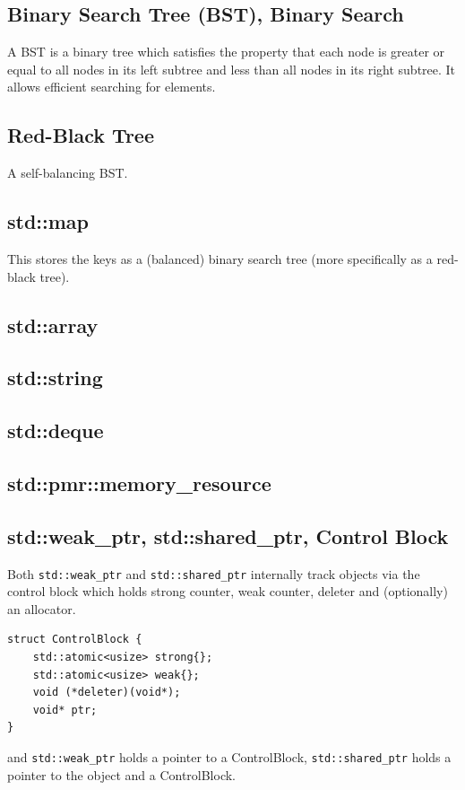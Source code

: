 \documentclass{article}
\begin{document}
\subsection{Binary Search Tree (BST), Binary Search}
A BST is a binary tree which satisfies the property that each node is greater or equal to all nodes in its left subtree and less than all nodes in its right subtree. It allows efficient searching for elements. 

\subsection{Red-Black Tree}
A self-balancing BST.

\subsection{std::map}
This stores the keys as a (balanced) binary search tree (more specifically as a red-black tree).

\subsection{std::array}
\subsection{std::string}
\subsection{std::deque}
\subsection{std::pmr::memory\_resource}
\subsection{std::weak\_ptr, std::shared\_ptr, Control Block}
Both \texttt{std::weak\_ptr} and \texttt{std::shared\_ptr} internally track objects via the control block which holds strong counter, weak counter, deleter and (optionally) an allocator.
\begin{lstlisting}
struct ControlBlock {
    std::atomic<usize> strong{};
    std::atomic<usize> weak{};
    void (*deleter)(void*);
    void* ptr;
}
\end{lstlisting}
and \texttt{std::weak\_ptr} holds a pointer to a ControlBlock, \texttt{std::shared\_ptr} holds a pointer to the object and a ControlBlock.
\end{document}
